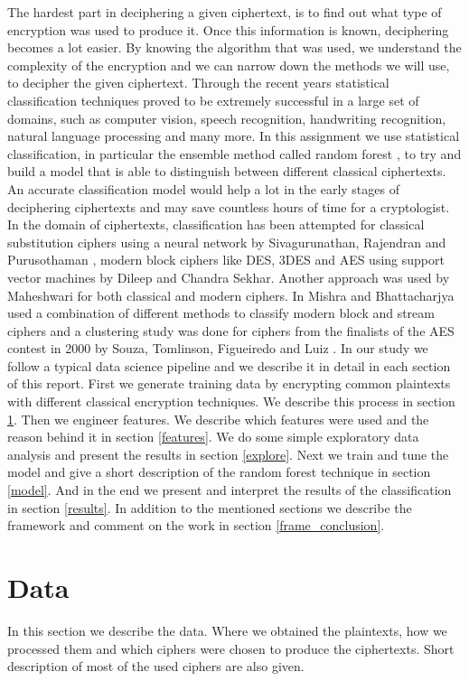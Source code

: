 \documentclass[a4paper]{article}
\begin{document}
The hardest part in deciphering a given ciphertext, is to find out what type of encryption was used to produce it. Once this information is known, deciphering becomes a lot easier. By knowing the algorithm that was used, we understand the complexity of the encryption and we can narrow down the methods we will use, to decipher the given ciphertext. Through the recent years statistical classification techniques proved to be extremely successful in a large set of domains, such as computer vision, speech recognition, handwriting recognition, natural language processing and many more. In this assignment we use statistical classification, in particular the ensemble method called random forest \cite{breiman2001random}, to try and build a model that is able to distinguish between different classical ciphertexts. An accurate classification model would help a lot in the early stages of deciphering ciphertexts and may save countless hours of time for a cryptologist. In the domain of ciphertexts, classification has been attempted for classical substitution ciphers using a neural network by Sivagurunathan, Rajendran and Purusothaman \cite{sivagurunathan2010classification}, modern block ciphers like DES, 3DES and AES using support vector machines by Dileep and Chandra Sekhar\cite{dileep2006identification}. Another approach was used by Maheshwari \cite{maheshwari2001classification} for both classical and modern ciphers. In \cite{mishra2013pattern} Mishra and Bhattacharjya used a combination of different methods to classify modern block and stream ciphers and a clustering study was done for ciphers from the finalists of the AES contest in 2000 by Souza, Tomlinson, Figueiredo and Luiz \cite{decipher}. In our study we follow a typical data science pipeline and we describe it in detail in each section of this report. First we generate training data by encrypting common plaintexts with different classical encryption techniques. We describe this process in section \ref{data}. Then we engineer features. We describe which features were used and the reason behind it in section \ref{features}. We do some simple exploratory data analysis and present the results in section \ref{explore}. Next we train and tune the model and give a short description of the random forest technique in section \ref{model}. And in the end we present and interpret the results of the classification in section \ref {results}. In addition to the mentioned sections we describe the framework and comment on the work in section \ref{frame_conclusion}.

\section{Data} \label{data}
In this section we describe the data. Where we obtained the plaintexts, how we processed them and which ciphers were chosen to produce the ciphertexts. Short description of most of the used ciphers are also given.
\end{document}
